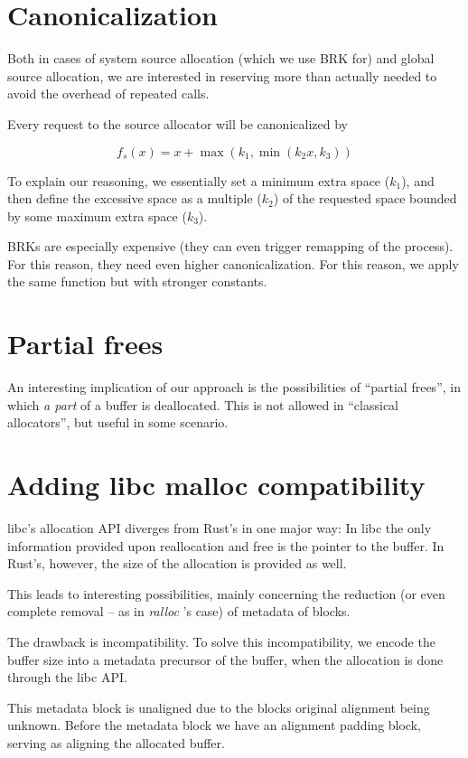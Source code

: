 \documentclass[11pt]{article}
\newcommand{\ralloc}{\emph{ralloc} }
\begin{document}
    \section{Canonicalization}
    Both in cases of system source allocation (which we use BRK for) and global
    source allocation, we are interested in reserving more than actually needed
    to avoid the overhead of repeated calls.

    Every request to the source allocator will be canonicalized by

    $$
        f_s(x) = x + \max(k_1, \min(k_2 x, k_3))
    $$

    To explain our reasoning, we essentially set a minimum extra space ($ k_1
    $), and then define the excessive space as a multiple ($ k_2 $) of the
    requested space bounded by some maximum extra space ($ k_3 $).

    BRKs are especially expensive (they can even trigger remapping of the
    process). For this reason, they need even higher canonicalization. For this
    reason, we apply the same function but with stronger constants.

    \section{Partial frees}
    An interesting implication of our approach is the possibilities of
    ``partial frees'', in which \emph{a part} of a buffer is deallocated. This
    is not allowed in ``classical allocators'', but useful in some scenario.

    \section{Adding libc malloc compatibility}
    libc's allocation API diverges from Rust's in one major way: In libc the
    only information provided upon reallocation and free is the pointer to the
    buffer. In Rust's, however, the size of the allocation is provided as
    well\cite{crichton15}.

    This leads to interesting possibilities, mainly concerning the reduction
    (or even complete removal -- as in \ralloc's case) of metadata of blocks.

    The drawback is incompatibility. To solve this incompatibility, we encode
    the buffer size into a metadata precursor of the buffer, when the
    allocation is done through the libc API.

    This metadata block is unaligned due to the blocks original alignment being
    unknown. Before the metadata block we have an alignment padding block,
    serving as aligning the allocated buffer.
\end{document}
